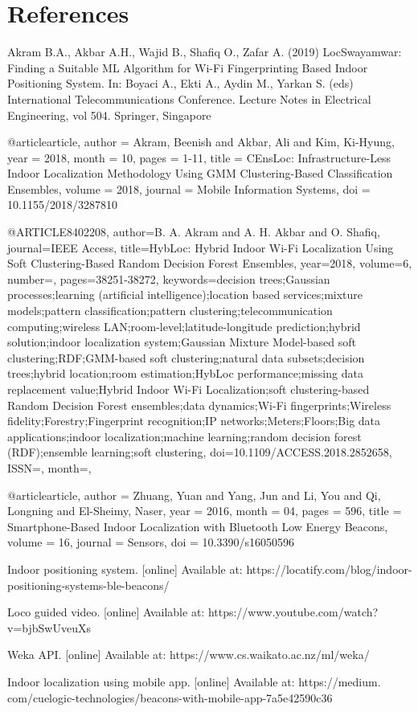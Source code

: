 \documentclass{article}
\begin{document}
\section{References}
\begin{thebibliography}{9}

Akram B.A., Akbar A.H., Wajid B., Shafiq O., Zafar A. (2019) LocSwayamwar: Finding a Suitable ML Algorithm for
 Wi-Fi Fingerprinting Based Indoor Positioning System. In: Boyaci A., Ekti A., Aydin M., Yarkan S. (eds) 
International Telecommunications Conference. Lecture Notes in Electrical Engineering, vol 504. Springer, Singapore

@article{article,
author = {Akram, Beenish and Akbar, Ali and Kim, Ki-Hyung},
year = {2018},
month = {10},
pages = {1-11},
title = {CEnsLoc: Infrastructure-Less Indoor Localization Methodology Using GMM Clustering-Based Classification Ensembles},
volume = {2018},
journal = {Mobile Information Systems},
doi = {10.1155/2018/3287810}
}

 @ARTICLE{8402208,
author={B. A. {Akram} and A. H. {Akbar} and O. {Shafiq}},
journal={IEEE Access},
title={HybLoc: Hybrid Indoor Wi-Fi Localization Using Soft Clustering-Based Random Decision Forest Ensembles},
year={2018},
volume={6},
number={},
pages={38251-38272},
keywords={decision trees;Gaussian processes;learning (artificial intelligence);location based services;mixture models;pattern classification;pattern clustering;telecommunication computing;wireless LAN;room-level;latitude-longitude prediction;hybrid solution;indoor localization system;Gaussian Mixture Model-based soft clustering;RDF;GMM-based soft clustering;natural data subsets;decision trees;hybrid location;room estimation;HybLoc performance;missing data replacement value;Hybrid Indoor Wi-Fi Localization;soft clustering-based Random Decision Forest ensembles;data dynamics;Wi-Fi fingerprints;Wireless fidelity;Forestry;Fingerprint recognition;IP networks;Meters;Floors;Big data applications;indoor localization;machine learning;random decision forest (RDF);ensemble learning;soft clustering},
doi={10.1109/ACCESS.2018.2852658},
ISSN={},
month={},}

 @article{article,
author = {Zhuang, Yuan and Yang, Jun and Li, You and Qi, Longning and El-Sheimy, Naser},
year = {2016},
month = {04},
pages = {596},
title = {Smartphone-Based Indoor Localization with Bluetooth Low Energy Beacons},
volume = {16},
journal = {Sensors},
doi = {10.3390/s16050596}
}

Indoor positioning system. [online] Available at: https://locatify.com/blog/indoor-positioning-systems-ble-beacons/

Loco guided video. [online] Available at: https://www.youtube.com/watch?v=bjbSwUveuXs


Weka API. [online] Available at: https://www.cs.waikato.ac.nz/ml/weka/



 Indoor localization using mobile app. [online] Available at: https://medium.
com/cuelogic-technologies/beacons-with-mobile-app-7a5e42590c36


\end{thebibliography}
\end{document}
